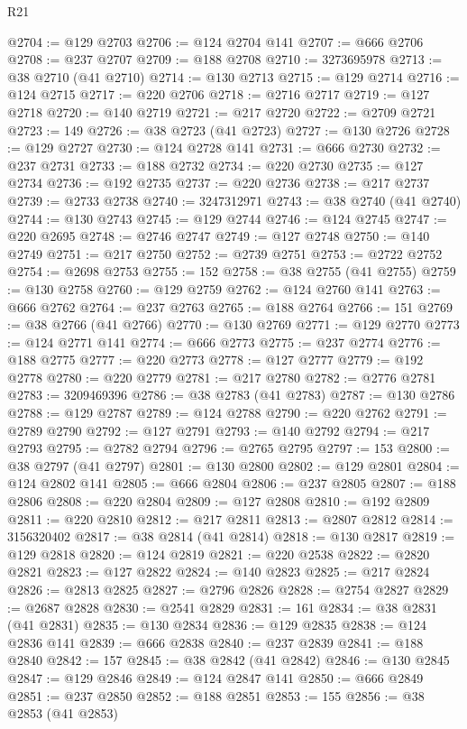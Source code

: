 \begin{lexlean}{R21}
\begin{coremodule}
@2704 := @129 @2703
@2706 := @124 @2704 @141
@2707 := @666 @2706
@2708 := @237 @2707
@2709 := @188 @2708
@2710 := 3273695978
@2713 := @38 @2710 (@41 @2710)
@2714 := @130 @2713
@2715 := @129 @2714
@2716 := @124 @2715
@2717 := @220 @2706
@2718 := @2716 @2717
@2719 := @127 @2718
@2720 := @140 @2719
@2721 := @217 @2720
@2722 := @2709 @2721
@2723 := 149
@2726 := @38 @2723 (@41 @2723)
@2727 := @130 @2726
@2728 := @129 @2727
@2730 := @124 @2728 @141
@2731 := @666 @2730
@2732 := @237 @2731
@2733 := @188 @2732
@2734 := @220 @2730
@2735 := @127 @2734
@2736 := @192 @2735
@2737 := @220 @2736
@2738 := @217 @2737
@2739 := @2733 @2738
@2740 := 3247312971
@2743 := @38 @2740 (@41 @2740)
@2744 := @130 @2743
@2745 := @129 @2744
@2746 := @124 @2745
@2747 := @220 @2695
@2748 := @2746 @2747
@2749 := @127 @2748
@2750 := @140 @2749
@2751 := @217 @2750
@2752 := @2739 @2751
@2753 := @2722 @2752
@2754 := @2698 @2753
@2755 := 152
@2758 := @38 @2755 (@41 @2755)
@2759 := @130 @2758
@2760 := @129 @2759
@2762 := @124 @2760 @141
@2763 := @666 @2762
@2764 := @237 @2763
@2765 := @188 @2764
@2766 := 151
@2769 := @38 @2766 (@41 @2766)
@2770 := @130 @2769
@2771 := @129 @2770
@2773 := @124 @2771 @141
@2774 := @666 @2773
@2775 := @237 @2774
@2776 := @188 @2775
@2777 := @220 @2773
@2778 := @127 @2777
@2779 := @192 @2778
@2780 := @220 @2779
@2781 := @217 @2780
@2782 := @2776 @2781
@2783 := 3209469396
@2786 := @38 @2783 (@41 @2783)
@2787 := @130 @2786
@2788 := @129 @2787
@2789 := @124 @2788
@2790 := @220 @2762
@2791 := @2789 @2790
@2792 := @127 @2791
@2793 := @140 @2792
@2794 := @217 @2793
@2795 := @2782 @2794
@2796 := @2765 @2795
@2797 := 153
@2800 := @38 @2797 (@41 @2797)
@2801 := @130 @2800
@2802 := @129 @2801
@2804 := @124 @2802 @141
@2805 := @666 @2804
@2806 := @237 @2805
@2807 := @188 @2806
@2808 := @220 @2804
@2809 := @127 @2808
@2810 := @192 @2809
@2811 := @220 @2810
@2812 := @217 @2811
@2813 := @2807 @2812
@2814 := 3156320402
@2817 := @38 @2814 (@41 @2814)
@2818 := @130 @2817
@2819 := @129 @2818
@2820 := @124 @2819
@2821 := @220 @2538
@2822 := @2820 @2821
@2823 := @127 @2822
@2824 := @140 @2823
@2825 := @217 @2824
@2826 := @2813 @2825
@2827 := @2796 @2826
@2828 := @2754 @2827
@2829 := @2687 @2828
@2830 := @2541 @2829
@2831 := 161
@2834 := @38 @2831 (@41 @2831)
@2835 := @130 @2834
@2836 := @129 @2835
@2838 := @124 @2836 @141
@2839 := @666 @2838
@2840 := @237 @2839
@2841 := @188 @2840
@2842 := 157
@2845 := @38 @2842 (@41 @2842)
@2846 := @130 @2845
@2847 := @129 @2846
@2849 := @124 @2847 @141
@2850 := @666 @2849
@2851 := @237 @2850
@2852 := @188 @2851
@2853 := 155
@2856 := @38 @2853 (@41 @2853)

\end{coremodule}
\end{lexlean}
